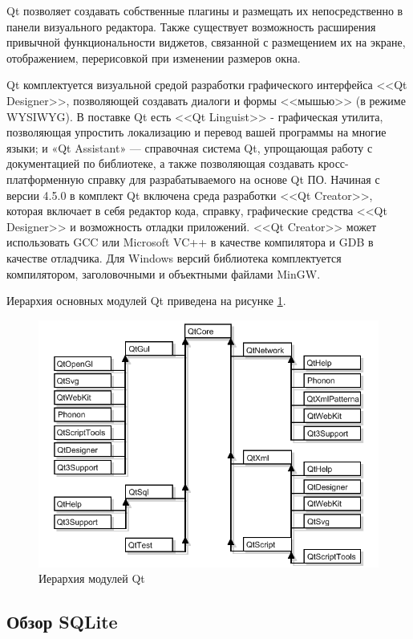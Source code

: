 Qt позволяет создавать собственные плагины и размещать их непосредственно в
панели визуального редактора. Также существует возможность расширения привычной
функциональности виджетов, связанной с размещением их на экране, отображением,
перерисовкой при изменении размеров окна.

Qt комплектуется визуальной средой разработки графического интерфейса
<<Qt Designer>>, позволяющей создавать диалоги и формы <<мышью>>
(в режиме WYSIWYG). В поставке Qt есть <<Qt Linguist>> - графическая утилита,
позволяющая упростить локализацию и перевод вашей программы на многие языки;
и «Qt Assistant» — справочная система Qt, упрощающая работу с документацией по
библиотеке, а также позволяющая создавать кросс-платформенную справку для
разрабатываемого на основе Qt ПО. Начиная с версии 4.5.0 в комплект Qt
включена среда разработки <<Qt Creator>>, которая включает в себя редактор кода,
справку, графические средства <<Qt Designer>> и возможность отладки
приложений. <<Qt Creator>> может использовать GCC или Microsoft VC++ в качестве
компилятора и GDB в качестве отладчика. Для Windows версий библиотека
комплектуется компилятором, заголовочными и объектными файлами MinGW.

Иерархия основных модулей Qt приведена на рисунке \ref{fig:qt-overview}.

\begin{figure}[h!]
    \centering
    \includegraphics[scale=0.5]{images/qt-overview.png}
    \caption{Иерархия модулей Qt}
    \label{fig:qt-overview}
\end{figure}

\subsection{Обзор SQLite}
\label{subsec:sqlite-overview}

